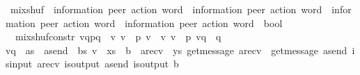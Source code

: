 \begin{isabellebody}
\isanewline
\isanewline
\isanewline
{}\isamarkupfalse%
\ mix{\isacharunderscore}{\kern0pt}shuf\ {\isacharcolon}{\kern0pt}{\isacharcolon}{\kern0pt}\ {\isachardoublequoteopen}{\isacharparenleft}{\kern0pt}{\isacharprime}{\kern0pt}information{\isacharcomma}{\kern0pt}\ {\isacharprime}{\kern0pt}peer{\isacharparenright}{\kern0pt}\ action\ word\ {\isasymRightarrow}\ {\isacharparenleft}{\kern0pt}{\isacharprime}{\kern0pt}information{\isacharcomma}{\kern0pt}\ {\isacharprime}{\kern0pt}peer{\isacharparenright}{\kern0pt}\ action\ word\ {\isasymRightarrow}\ {\isacharparenleft}{\kern0pt}{\isacharprime}{\kern0pt}information{\isacharcomma}{\kern0pt}\ {\isacharprime}{\kern0pt}peer{\isacharparenright}{\kern0pt}\ action\ word\ {\isasymRightarrow}\ {\isacharparenleft}{\kern0pt}{\isacharprime}{\kern0pt}information{\isacharcomma}{\kern0pt}\ {\isacharprime}{\kern0pt}peer{\isacharparenright}{\kern0pt}\ action\ word\ {\isasymRightarrow}\ bool{\isachardoublequoteclose}\ \ \ \isanewline
\ \ mix{\isacharunderscore}{\kern0pt}shuf{\isacharunderscore}{\kern0pt}constr{\isacharcolon}{\kern0pt}\ {\isachardoublequoteopen}{\isasymlbrakk}vq{\isasymdown}\isactrlsub {\isacharbang}{\kern0pt}{\isasymdown}\isactrlsub {\isacharbraceleft}{\kern0pt}\isactrlsub p\isactrlsub {\isacharcomma}{\kern0pt}\isactrlsub q\isactrlsub {\isacharbraceright}{\kern0pt}{\isasymdown}\isactrlsub {\isacharbang}{\kern0pt}\isactrlsub {\isacharquery}{\kern0pt}\ {\isacharequal}{\kern0pt}\ v{\isasymdown}\isactrlsub {\isacharquery}{\kern0pt}{\isasymdown}\isactrlsub {\isacharbang}{\kern0pt}\isactrlsub {\isacharquery}{\kern0pt}{\isacharsemicolon}{\kern0pt}\ v{\isacharprime}{\kern0pt}\ {\isasymin}\ {\isasymL}\isactrlsup {\isacharasterisk}{\kern0pt}\isactrlsub {\isasymsqunion}\isactrlsub {\isasymsqunion}{\isacharparenleft}{\kern0pt}p{\isacharparenright}{\kern0pt}{\isacharsemicolon}{\kern0pt}\ v{\isacharprime}{\kern0pt}\ {\isasymsqunion}{\isasymsqunion}\isactrlsub {\isacharquery}{\kern0pt}\ v{\isacharsemicolon}{\kern0pt}\ v\ {\isasymin}\ {\isasymL}\isactrlsup {\isacharasterisk}{\kern0pt}{\isacharparenleft}{\kern0pt}p{\isacharparenright}{\kern0pt}{\isacharsemicolon}{\kern0pt}\ vq\ {\isasymin}\ {\isasymL}\isactrlsup {\isacharasterisk}{\kern0pt}{\isacharparenleft}{\kern0pt}q{\isacharparenright}{\kern0pt}{\isacharsemicolon}{\kern0pt}\ \isanewline
vq\ {\isacharequal}{\kern0pt}\ {\isacharparenleft}{\kern0pt}as\ {\isasymsqdot}\ a{\isacharunderscore}{\kern0pt}send\ {\isacharhash}{\kern0pt}\ bs{\isacharparenright}{\kern0pt}{\isacharsemicolon}{\kern0pt}\ v\ {\isacharequal}{\kern0pt}\ xs\ {\isasymsqdot}\ b\ {\isacharhash}{\kern0pt}\ a{\isacharunderscore}{\kern0pt}recv\ {\isacharhash}{\kern0pt}\ ys{\isacharsemicolon}{\kern0pt}\ get{\isacharunderscore}{\kern0pt}message\ a{\isacharunderscore}{\kern0pt}recv\ {\isacharequal}{\kern0pt}\ get{\isacharunderscore}{\kern0pt}message\ a{\isacharunderscore}{\kern0pt}send{\isacharsemicolon}{\kern0pt}\ is{\isacharunderscore}{\kern0pt}input\ a{\isacharunderscore}{\kern0pt}recv{\isacharsemicolon}{\kern0pt}\ is{\isacharunderscore}{\kern0pt}output\ a{\isacharunderscore}{\kern0pt}send{\isacharsemicolon}{\kern0pt}\ is{\isacharunderscore}{\kern0pt}output\ b{\isasymrbrakk}\ \isanewline

\end{isabellebody}
